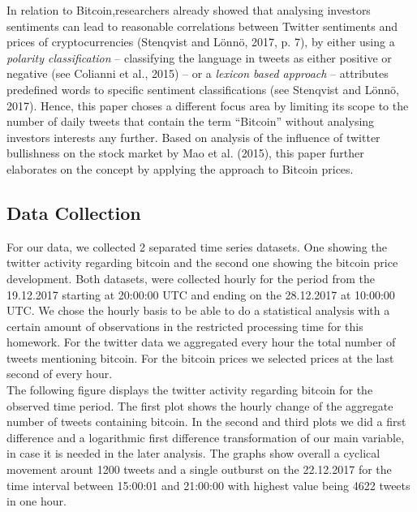 \documentclass[a4paper,american,12pt]{article}
\begin{document}
\begin{spacing}{1.2}
In relation to Bitcoin,researchers already showed that analysing investors sentiments can lead to reasonable correlations between Twitter sentiments and prices of cryptocurrencies (Stenqvist and Lönnö, 2017, p. 7), by either using a \textit{polarity classification} – classifying the language in tweets as either positive or negative (see Colianni et al., 2015) – or a \textit{lexicon based approach} – attributes predefined words to specific sentiment classifications (see Stenqvist and Lönnö, 2017). Hence, this paper choses a different focus area by limiting its scope to the number of daily tweets that contain the term “Bitcoin” without analysing investors interests any further. Based on analysis of the influence of twitter bullishness on the stock market by Mao et al. (2015), this paper further elaborates on the concept by applying the approach to Bitcoin prices.\\


		
\subsection{Data Collection}
For our data, we collected 2 separated time series datasets. One showing the twitter activity regarding bitcoin and the second one showing the bitcoin price development. Both datasets, were collected hourly for the period from the 19.12.2017 starting at 20:00:00 UTC and ending on the 28.12.2017 at 10:00:00 UTC. We chose the hourly basis to be able to do a statistical analysis with a certain amount of observations in the restricted processing time for this homework. For the twitter data we aggregated every hour the total number of tweets mentioning bitcoin. For the bitcoin prices we selected prices at the last second of every hour.\\
The following figure displays the twitter activity regarding bitcoin for the observed time period. The first plot shows the hourly change of the aggregate number of tweets containing bitcoin. In the second and third plots we did a first difference and a logarithmic first difference transformation of our main variable, in case it is needed in the later analysis. The graphs show overall a cyclical movement arount 1200 tweets and a single outburst on the 22.12.2017 for the time interval between 15:00:01 and 21:00:00 with highest value being 4622 tweets in one hour.\\


\end{spacing}
\end{document}
